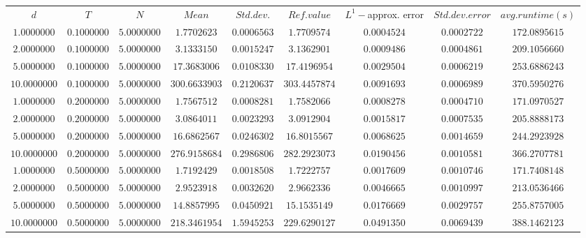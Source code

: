 \begin{tabular}{ccccccccc}
$d$ & $T$ & $N$ & $Mean$ & $Std. dev.$ & $Ref. value$ & $L^1-$approx. error & $Std. dev. error$ & $avg. runtime (s)$\\
$1.0000000$ & $0.1000000$ & $5.0000000$ & $1.7702623$ & $0.0006563$ & $1.7709574$ & $0.0004524$ & $0.0002722$ & $172.0895615$\\
$2.0000000$ & $0.1000000$ & $5.0000000$ & $3.1333150$ & $0.0015247$ & $3.1362901$ & $0.0009486$ & $0.0004861$ & $209.1056660$\\
$5.0000000$ & $0.1000000$ & $5.0000000$ & $17.3683006$ & $0.0108330$ & $17.4196954$ & $0.0029504$ & $0.0006219$ & $253.6886243$\\
$10.0000000$ & $0.1000000$ & $5.0000000$ & $300.6633903$ & $0.2120637$ & $303.4457874$ & $0.0091693$ & $0.0006989$ & $370.5950276$\\
$1.0000000$ & $0.2000000$ & $5.0000000$ & $1.7567512$ & $0.0008281$ & $1.7582066$ & $0.0008278$ & $0.0004710$ & $171.0970527$\\
$2.0000000$ & $0.2000000$ & $5.0000000$ & $3.0864011$ & $0.0023293$ & $3.0912904$ & $0.0015817$ & $0.0007535$ & $205.8888173$\\
$5.0000000$ & $0.2000000$ & $5.0000000$ & $16.6862567$ & $0.0246302$ & $16.8015567$ & $0.0068625$ & $0.0014659$ & $244.2923928$\\
$10.0000000$ & $0.2000000$ & $5.0000000$ & $276.9158684$ & $0.2986806$ & $282.2923073$ & $0.0190456$ & $0.0010581$ & $366.2707781$\\
$1.0000000$ & $0.5000000$ & $5.0000000$ & $1.7192429$ & $0.0018508$ & $1.7222757$ & $0.0017609$ & $0.0010746$ & $171.7408148$\\
$2.0000000$ & $0.5000000$ & $5.0000000$ & $2.9523918$ & $0.0032620$ & $2.9662336$ & $0.0046665$ & $0.0010997$ & $213.0536466$\\
$5.0000000$ & $0.5000000$ & $5.0000000$ & $14.8857995$ & $0.0450921$ & $15.1535149$ & $0.0176669$ & $0.0029757$ & $255.8757005$\\
$10.0000000$ & $0.5000000$ & $5.0000000$ & $218.3461954$ & $1.5945253$ & $229.6290127$ & $0.0491350$ & $0.0069439$ & $388.1462123$\\
\end{tabular}
